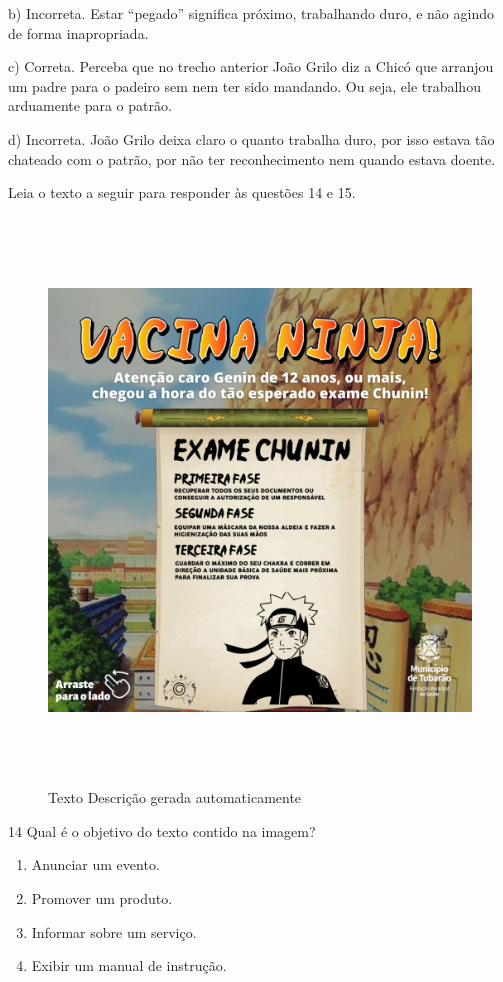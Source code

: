 b) Incorreta. Estar ``pegado'' significa próximo, trabalhando duro, e
não agindo de forma inapropriada.

c) Correta. Perceba que no trecho anterior João Grilo diz a Chicó que
arranjou um padre para o padeiro sem nem ter sido mandando. Ou seja, ele
trabalhou arduamente para o patrão.

d) Incorreta. João Grilo deixa claro o quanto trabalha duro, por isso
estava tão chateado com o patrão, por não ter reconhecimento nem quando
estava doente.

Leia o texto a seguir para responder às questões 14 e 15.

\begin{figure}
\centering
\includegraphics[width=5.90556in,height=5.90556in]{./imgSAEB_6_POR/media/image51.png}
\caption{Texto Descrição gerada automaticamente}
\end{figure}


\num{14} Qual é o objetivo do texto contido na imagem?

\begin{enumerate}
\def\labelenumi{\alph{enumi})}
\item
  Anunciar um evento.
\item
  Promover um produto.
\item
  Informar sobre um serviço.
\item
  Exibir um manual de instrução.
\end{enumerate}

